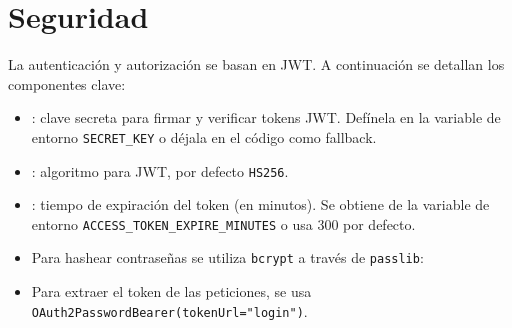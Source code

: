 \documentclass[a4paper,11pt,spanish]{sphinxmanual}
\newcommand{\robotoMonoBold}{\fontseries{b}\selectfont\ttfamily}
\renewcommand{\sphinxcode}[1]{\textcolor{sphinxorangeCode}{{\robotoMonoBold #1}}}
\renewcommand{\sphinxupquote}[1]{\texttt{#1}}
\begin{document}
\section{Seguridad}
\label{\detokenize{configuracion:seguridad}}
\sphinxAtStartPar
La autenticación y autorización se basan en JWT. A continuación se detallan los componentes clave:
\begin{itemize}
\item {} 
\sphinxAtStartPar
{}: clave secreta para firmar y verificar tokens JWT. Defínela en la variable de entorno \sphinxcode{\sphinxupquote{SECRET\_KEY}} o déjala en el código como fallback.

\item {} 
\sphinxAtStartPar
{}: algoritmo para JWT, por defecto \sphinxcode{\sphinxupquote{HS256}}.

\item {} 
\sphinxAtStartPar
{}: tiempo de expiración del token (en minutos). Se obtiene de la variable de entorno \sphinxcode{\sphinxupquote{ACCESS\_TOKEN\_EXPIRE\_MINUTES}} o usa 300 por defecto.

\item {} 
\sphinxAtStartPar
Para hashear contraseñas se utiliza \sphinxcode{\sphinxupquote{bcrypt}} a través de \sphinxcode{\sphinxupquote{passlib}}:

\begin{sphinxVerbatim}[commandchars=\\\{\}]
  \PYG{p}{[}\PYG{p}{]} 
\end{sphinxVerbatim}

\item {} 
\sphinxAtStartPar
Para extraer el token de las peticiones, se usa \sphinxcode{\sphinxupquote{OAuth2PasswordBearer(tokenUrl="login")}}.

\end{itemize}
\end{document}
